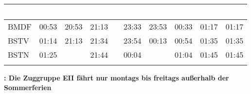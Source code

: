 \begin{center}
\begin{tabular}
\begin{tabular}
\begin{tabular}
\myhline
\end{tabular}
\begin{tabular}{!{\color{pastellorangs}\vrule width 3pt}l!{\color{pastellorangs}\vrule width 3pt}*{5}{c|}c!{\color{pastellorangs}\vrule width 2pt height 2pt}*{3}{c!{\color{pastellorangs}\vrule width 3pt}}}
\hline
{}
 & \textcolor{white}{\bfseries F-S} & \textcolor{white}{\bfseries (Sa)} & \textcolor{white}{\bfseries (So)} \\
\hline
BMDF     &
00:53 & 20:53 & 21:13 &  & 23:33 & 23:53 &
00:33 &
01:17 &
01:17 \\
BSTV     &
01:14 & 21:13 & 21:34 & \pos{}   & 23:54 & 00:13 &
00:54 &
01:35 &
01:35 \\
BSTN     &
01:25 &       & 21:44 &  & 00:04 &       &
01:04 &
01:45 &
01:45 \\
\myhline
\end{tabular}
\fi
\ifeiche

{\bfseries *: Die Zuggruppe EII fährt nur montags bis freitags außerhalb der Sommerferien}
\fi
\fi


\end{tabular}
\end{tabular}
\end{center}
